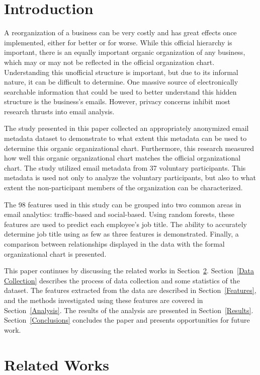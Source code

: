 \documentclass[10pt,twocolumn,conference]{IEEEtran}
\begin{document}
\section{Introduction}
A reorganization of a business can be very costly and has great effects once implemented, either for better or for worse.  While this official hierarchy is important, there is an equally important organic organization of any business, which may or may not be reflected in the official organization chart.  Understanding this unofficial structure is important, but due to its informal nature, it can be difficult to determine.  One massive source of electronically searchable information that could be used to better understand this hidden structure is the business's emails.  However, privacy concerns inhibit most research thrusts into email analysis.  

The study presented in this paper collected an appropriately anonymized email metadata dataset to demonstrate to what extent this metadata can be used to determine this organic organizational chart.  Furthermore, this research measured how well this organic organizational chart matches the official organizational chart.  The study utilized email metadata from 37 voluntary participants.  This metadata is used not only to analyze the voluntary participants, but also to what extent the non-participant members of the organization can be characterized.

The 98 features used in this study can be grouped into two common areas in email analytics: traffic-based and social-based. Using random forests, these features are used to predict each employee's job title.  The ability to accurately determine job title using as few as three features is demonstrated.  Finally, a comparison between relationships displayed in the data with the formal organizational chart is presented.  

This paper continues by discussing the related works in Section~\ref{Related Works}.  Section~\ref{Data Collection} describes the process of data collection and some statistics of the dataset.  The features extracted from the data are described in Section~\ref{Features}, and the methods investigated using these features are covered in Section~\ref{Analysis}.  The results of the analysis are presented in Section~\ref{Results}.  Section~\ref{Conclusions} concludes the paper and presents opportunities for future work.  

\section{Related Works} \label{Related Works}
\end{document}
